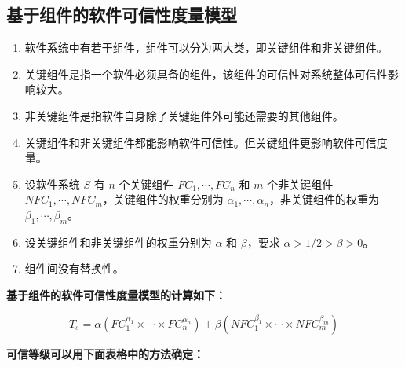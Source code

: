 \documentclass{article}
\begin{document}
\subsection{基于组件的软件可信性度量模型}

\begin {enumerate}
\item 软件系统中有若干组件，组件可以分为两大类，即关键组件和非关键组件。
\item 关键组件是指一个软件必须具备的组件，该组件的可信性对系统整体可信性影响较大。
\item 非关键组件是指软件自身除了关键组件外可能还需要的其他组件。
\item 关键组件和非关键组件都能影响软件可信性。但关键组件更影响软件可信度量。
\item 设软件系统 $ S $ 有 $ n $ 个关键组件 $ FC_1, \cdots, FC_n $ 和 $ m $ 个非关键组件 $ NFC_1, \cdots, NFC_m $，关键组件的权重分别为 $ \alpha_1, \cdots, \alpha_n $，非关键组件的权重为 $ \beta_1, \cdots, \beta_m $。
\item 设关键组件和非关键组件的权重分别为 $ \alpha $ 和 $ \beta $，要求 $ \alpha > 1/2 > \beta > 0 $。
\item 组件间没有替换性。
\end{enumerate}

\textbf{基于组件的软件可信性度量模型的计算如下：}

\[ T_s = \alpha (FC_1^{\alpha_1} \times \cdots \times FC_n^{\alpha_n}) + \beta (NFC_1^{\beta_1} \times \cdots \times NFC_m^{\beta_m}) \]

\textbf{可信等级可以用下面表格中的方法确定：}
\end{document}
